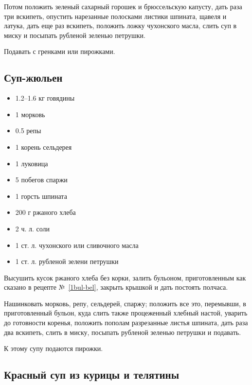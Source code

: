 Потом положить зеленый сахарный горошек и брюссельскую капусту, дать раза три вскипеть, опустить нарезанные полосками листики шпината, щавеля и латука, дать еще раз вскипеть, положить ложку чухонского масла, слить суп в миску и посыпать рубленой зеленью петрушки.

Подавать с гренками или пирожками.

\subsection{Суп-жюльен}\label{5sup-zhuljen}

\begin{itemize}
	\item 1.2–1.6 кг говядины 
    \item 1 морковь 
    \item 0.5 репы 
    \item 1 корень сельдерея 
    \item 1 луковица 
    \item 5 побегов спаржи 
    \item 1 горсть шпината 
    \item 200 г ржаного хлеба 
    \item 2 ч. л. соли 
    \item 1 ст. л. чухонского или сливочного масла 
    \item 1 ст. л. рубленой зелени петрушки
\end{itemize}

Высушить кусок ржаного хлеба без корки, залить бульоном, приготовленным как сказано в рецепте №~\ref{1bul-bel}, закрыть крышкой и дать постоять полчаса.

Нашинковать морковь, репу, сельдерей, спаржу; положить все это, перемывши, в приготовленный бульон, куда слить также процеженный хлебный настой, уварить до готовности коренья, положить пополам разрезанные листья шпината, дать раза два вскипеть, слить в миску, посыпать рубленой зеленью петрушки и подавать.

К этому супу подаются пирожки.

\subsection{Красный суп из курицы и телятины}\label{6krasn-sup-kur-tel}

